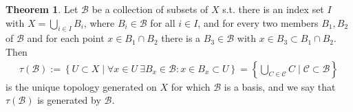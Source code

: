 \documentclass[12pt, a4paper]{article}
\numberwithin{equation}{section}
\theoremstyle{definition}
\theoremstyle{definition}
\newtheorem{theorem}[thm]{Theorem}
\begin{document}
		\begin{theorem}\label{thrm:gen_top_by_coll_subsets}
			Let $\mathscr B$ be a collection of subsets of $X$ s.t. there is an index set $I$ with $X = \bigcup_{i\in I}B_i$, where $B_i\in\mathscr B$ for all $i\in I$, and for every two members $B_1, B_2$ of $\mathscr B$ and for each point $x\in B_1\cap B_2$ there is a $B_3\in\mathscr B$ with $x\in B_3\subset B_1\cap B_2$. Then 
			\begin{align}\label{eq:gen_top_by_coll_subsets}
				\tau(\mathscr B) := \left\{ U\subset X \mid \forall x\in U\ \exists B_x\in\mathscr B: x\in B_x\subset U\right\} = \left\{ \bigcup_{C\in\mathscr C} C \mid \mathscr C \subset \mathscr B \right\}
			\end{align} is the unique topology generated on $X$ for which $\mathscr B$ is a basis, and we say that $\tau(\mathscr B)$ is generated by $\mathscr B$.
		\end{theorem}	
		
\end{document}
